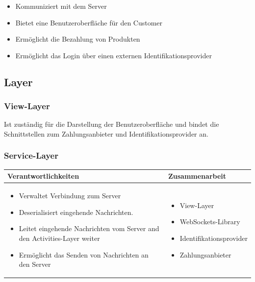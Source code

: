 {\begin{itemize}
	\item Kommuniziert mit dem Server
	\item Bietet eine Benutzeroberfläche für den Customer
	\item Ermöglicht die Bezahlung von Produkten
	\item Ermöglicht das Login über einen externen Identifikationsprovider
\end{itemize}

\subsection{Layer}

\subsubsection{View-Layer}
Ist zuständig für die Darstellung der Benutzeroberfläche und bindet die Schnittstellen zum Zahlungsanbieter und Identifikationsprovider an.

\subsubsection{Service-Layer}
\begin{tabular}{|p{}|p{}|} \hline
	\textbf{Verantwortlichkeiten} & \textbf{Zusammenarbeit} \\ \hline \hline
	
	\begin{itemize}
		\item Verwaltet Verbindung zum Server
		\item Deserialisiert eingehende Nachrichten.
		\item Leitet eingehende Nachrichten vom Server and den Activities-Layer weiter
		\item Ermöglicht das Senden von Nachrichten an den Server
	\end{itemize}&
	\begin{itemize}
		\item View-Layer
		\item WebSockets-Library
		\item Identifikationsprovider
		\item Zahlungsanbieter
	\end{itemize}
	\\ \hline
\end{tabular}

}
